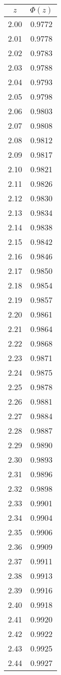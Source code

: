 \begin{tabular}{|c|c|}\hline
$z$ & $\Phi(z)$ \\ \hline
2.00 & 0.9772\\
2.01 & 0.9778\\
2.02 & 0.9783\\
2.03 & 0.9788\\
2.04 & 0.9793\\
2.05 & 0.9798\\
2.06 & 0.9803\\
2.07 & 0.9808\\
2.08 & 0.9812\\
2.09 & 0.9817\\
2.10 & 0.9821\\
2.11 & 0.9826\\
2.12 & 0.9830\\
2.13 & 0.9834\\
2.14 & 0.9838\\
2.15 & 0.9842\\
2.16 & 0.9846\\
2.17 & 0.9850\\
2.18 & 0.9854\\
2.19 & 0.9857\\
2.20 & 0.9861\\
2.21 & 0.9864\\
2.22 & 0.9868\\
2.23 & 0.9871\\
2.24 & 0.9875\\
2.25 & 0.9878\\
2.26 & 0.9881\\
2.27 & 0.9884\\
2.28 & 0.9887\\
2.29 & 0.9890\\
2.30 & 0.9893\\
2.31 & 0.9896\\
2.32 & 0.9898\\
2.33 & 0.9901\\
2.34 & 0.9904\\
2.35 & 0.9906\\
2.36 & 0.9909\\
2.37 & 0.9911\\
2.38 & 0.9913\\
2.39 & 0.9916\\
2.40 & 0.9918\\
2.41 & 0.9920\\
2.42 & 0.9922\\
2.43 & 0.9925\\
2.44 & 0.9927\\

\end{tabular}
